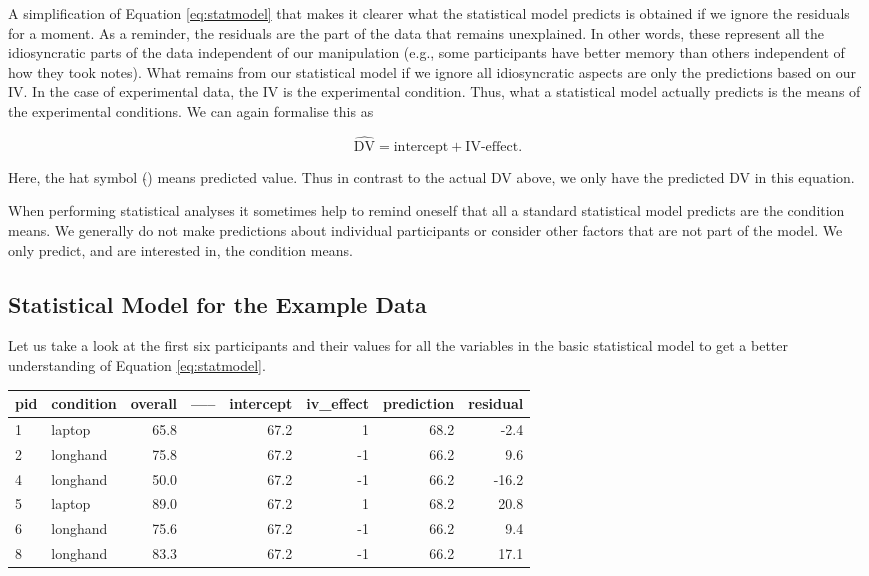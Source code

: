 \documentclass[
]{book}
\begin{document}
A simplification of Equation \eqref{eq:statmodel} that makes it clearer what the statistical model predicts is obtained if we ignore the residuals for a moment. As a reminder, the residuals are the part of the data that remains unexplained. In other words, these represent all the idiosyncratic parts of the data independent of our manipulation (e.g., some participants have better memory than others independent of how they took notes). What remains from our statistical model if we ignore all idiosyncratic aspects are only the predictions based on our IV. In the case of experimental data, the IV is the experimental condition. Thus, what a statistical model actually predicts is the means of the experimental conditions. We can again formalise this as

\begin{equation}
\hat{\text{DV}} = \text{intercept} + \text{IV-effect}.
\label{eq:predmodel}
\end{equation}

Here, the hat symbol (\(\hat{}\)) means predicted value. Thus in contrast to the actual DV above, we only have the predicted DV in this equation.

When performing statistical analyses it sometimes help to remind oneself that all a standard statistical model predicts are the condition means. We generally do not make predictions about individual participants or consider other factors that are not part of the model. We only predict, and are interested in, the condition means.

\hypertarget{statistical-model-for-the-example-data}{%
\subsection{Statistical Model for the Example Data}\label{statistical-model-for-the-example-data}}

Let us take a look at the first six participants and their values for all the variables in the basic statistical model to get a better understanding of Equation \eqref{eq:statmodel}.

\begin{tabular}{l|l|r|l|r|r|r|r}
\hline
pid & condition & overall & ----- & intercept & iv\_effect & prediction & residual\\
\hline
1 & laptop & 65.8 &  & 67.2 & 1 & 68.2 & -2.4\\
\hline
2 & longhand & 75.8 &  & 67.2 & -1 & 66.2 & 9.6\\
\hline
4 & longhand & 50.0 &  & 67.2 & -1 & 66.2 & -16.2\\
\hline
5 & laptop & 89.0 &  & 67.2 & 1 & 68.2 & 20.8\\
\hline
6 & longhand & 75.6 &  & 67.2 & -1 & 66.2 & 9.4\\
\hline
8 & longhand & 83.3 &  & 67.2 & -1 & 66.2 & 17.1\\
\hline
\end{tabular}
\end{document}
